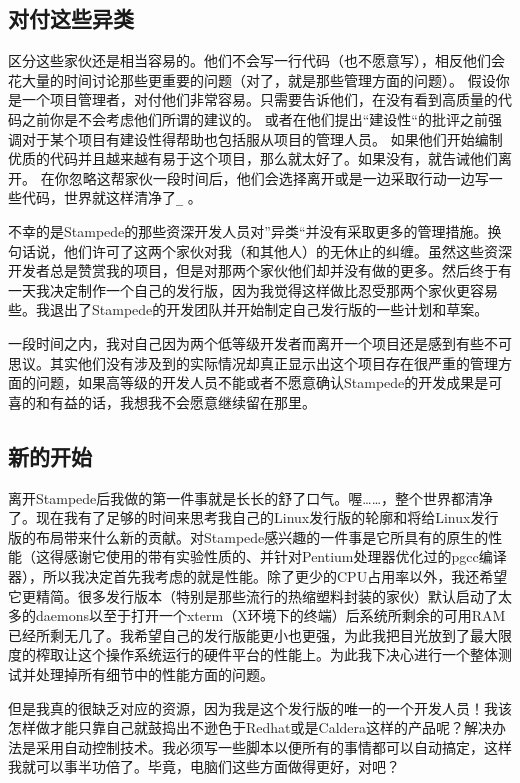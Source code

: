 \subsection{对付这些异类}

区分这些家伙还是相当容易的。他们不会写一行代码（也不愿意写），相反他们会花大量的时间讨论那些更重要的问题（对了，就是那些管理方面的问题）。
假设你是一个项目管理者，对付他们非常容易。只需要告诉他们，在没有看到高质量的代码之前你是不会考虑他们所谓的建议的。
或者在他们提出“建设性“的批评之前强调对于某个项目有建设性得帮助也包括服从项目的管理人员。
如果他们开始编制优质的代码并且越来越有易于这个项目，那么就太好了。如果没有，就告诫他们离开。
在你忽略这帮家伙一段时间后，他们会选择离开或是一边采取行动一边写一些代码，世界就这样清净了\verb ^_^ 。

不幸的是Stampede的那些资深开发人员对”异类“并没有采取更多的管理措施。换句话说，他们许可了这两个家伙对我（和其他人）的无休止的纠缠。虽然这些资深开发者总是赞赏我的项目，但是对那两个家伙他们却并没有做的更多。然后终于有一天我决定制作一个自己的发行版，因为我觉得这样做比忍受那两个家伙更容易些。我退出了Stampede的开发团队并开始制定自己发行版的一些计划和草案。

一段时间之内，我对自己因为两个低等级开发者而离开一个项目还是感到有些不可思议。其实他们没有涉及到的实际情况却真正显示出这个项目存在很严重的管理方面的问题，如果高等级的开发人员不能或者不愿意确认Stampede的开发成果是可喜的和有益的话，我想我不会愿意继续留在那里。

\subsection{新的开始}

离开Stampede后我做的第一件事就是长长的舒了口气。喔……，整个世界都清净了。现在我有了足够的时间来思考我自己的Linux发行版的轮廓和将给Linux发行版的布局带来什么新的贡献。对Stampede感兴趣的一件事是它所具有的原生的性能（这得感谢它使用的带有实验性质的、并针对Pentium处理器优化过的pgcc编译器），所以我决定首先我考虑的就是性能。除了更少的CPU占用率以外，我还希望它更精简。很多发行版本（特别是那些流行的热缩塑料封装的家伙）默认启动了太多的daemons以至于打开一个xterm（X环境下的终端）后系统所剩余的可用RAM已经所剩无几了。我希望自己的发行版能更小也更强，为此我把目光放到了最大限度的榨取让这个操作系统运行的硬件平台的性能上。为此我下决心进行一个整体测试并处理掉所有细节中的性能方面的问题。

但是我真的很缺乏对应的资源，因为我是这个发行版的唯一的一个开发人员！我该怎样做才能只靠自己就鼓捣出不逊色于Redhat或是Caldera这样的产品呢？解决办法是采用自动控制技术。我必须写一些脚本以便所有的事情都可以自动搞定，这样我就可以事半功倍了。毕竟，电脑们这些方面做得更好，对吧？

